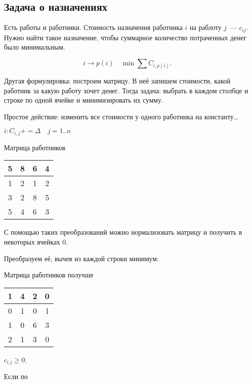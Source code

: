 \subsection{Задача о назначениях}

Есть работы и работники. Стоимость назначения работника $i$ на раблоту $j$~--- $c_{ij }$. Нужно найти такое назначение, чтобы суммарное количество потраченных денег было минимальным.

\[
i \to p(i)\quad \min\sum C_{i, p(i)}
.\]

Другая формулировка: построим матрицу. В неё запишем стоимости, какой работник за какую работу хочет денег.
Тогда задача: выбрать в каждом столбце и строке по одной ячейке и минимизировать их сумму.

\begin{note}
    Простое действие: изменить все стоимости у одного работника на константу\ldots

    $i: C_{i,j} + =\Delta \quad j = 1..n$
\end{note}

\begin{example}Матрица работников
    \begin{center}
        \label{tab:mat}
        \begin{tabular}{|c|c|c|c|}
            \hline
            5&8&6&4\\ \hline
            1&2&1&2\\ \hline
            3&2&8&5\\ \hline
            5&4&6&3\\ \hline
        \end{tabular}
    \end{center}
\end{example}

\begin{statement}
    С помощью таких преобразований можно нормализовать матрицу и получить в некоторых ячейках $0$.
\end{statement}

\begin{example}
    Преобразуем её, вычев из каждой строки минимум:
    \begin{center}
        Матрица работников получше

        \label{tab:matbet}
        \begin{tabular}{|c|c|c|c|}
        \hline
        1&4&2&0\\
        \hline
        0&1&0&1\\
        \hline
        1&0&6&3\\
        \hline
        2&1&3&0\\
        \hline
        \end{tabular}

        $c_{i.j} \geqslant 0$.
    \end{center}
    Если по
\end{example}

